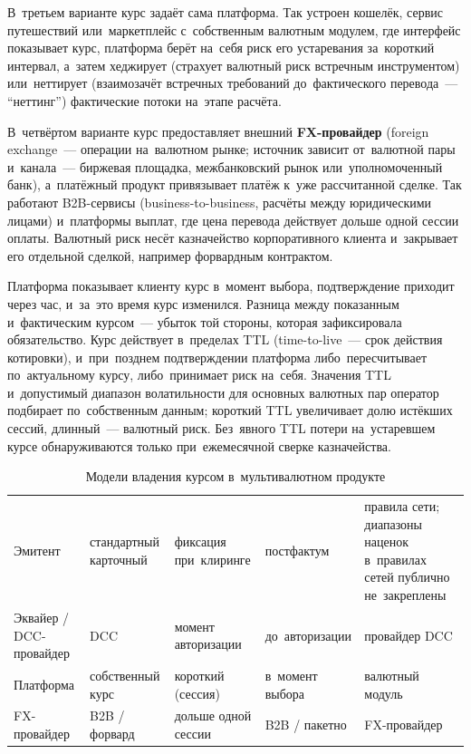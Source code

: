 В~третьем варианте курс задаёт сама платформа. Так устроен кошелёк, сервис
путешествий или~маркетплейс с~собственным валютным модулем, где интерфейс
показывает курс, платформа берёт на~себя риск его устаревания за~короткий
интервал, а~затем хеджирует (страхует валютный риск встречным инструментом)
или~неттирует (взаимозачёт встречных требований до~фактического перевода~---
\enquote{неттинг}) фактические потоки на~этапе расчёта.

В~четвёртом варианте курс предоставляет внешний \textbf{FX-провайдер} (foreign
  exchange~--- операции на~валютном рынке; источник зависит от~валютной пары
и~канала~--- биржевая площадка, межбанковский рынок или~уполномоченный банк),
а~платёжный продукт привязывает платёж к~уже рассчитанной сделке. Так работают
B2B-сервисы (business-to-business, расчёты между юридическими лицами) и~платформы выплат, где цена перевода действует дольше одной сессии
оплаты. Валютный риск несёт казначейство корпоративного клиента и~закрывает его
отдельной сделкой, например форвардным контрактом.

Платформа показывает клиенту курс в~момент выбора, подтверждение приходит через
час, и~за~это время курс изменился. Разница между показанным и~фактическим
курсом~--- убыток той стороны, которая зафиксировала обязательство. Курс
действует в~пределах TTL (time-to-live~--- срок действия котировки),
и~при~позднем подтверждении платформа либо~пересчитывает по~актуальному курсу,
либо~принимает риск на~себя. Значения TTL и~допустимый диапазон волатильности
для основных валютных пар оператор подбирает по~собственным данным; короткий
TTL увеличивает долю истёкших сессий, длинный~--- валютный риск. Без~явного TTL
потери на~устаревшем курсе обнаруживаются только при~ежемесячной сверке
казначейства.

\begin{table}[tbp]
  \caption{Модели владения курсом в~мультивалютном
  продукте}\label{tab:fx-ownership-models}
  \begingroup
  \tablesetup
  \begin{tabularx}{\textwidth}{@{}B{0.2\textwidth} P{0.16\textwidth} Y P{0.16\textwidth} Y@{}}
    \toprule
    \headrow
     &  &  &  &  \\
    \midrule
    Эмитент & стандартный карточный & фиксация при~клиринге & постфактум &
    правила сети; диапазоны наценок в~правилах сетей публично не~закреплены \\
    \rowsep
    Эквайер / DCC-провайдер & DCC & момент авторизации & до~авторизации & провайдер DCC \\
    \rowsep
    Платформа & собственный курс & короткий (сессия) & в~момент выбора & валютный модуль \\
    \rowsep
    FX-провайдер & B2B / форвард & дольше одной сессии & B2B / пакетно & FX-провайдер \\
    \bottomrule
  \end{tabularx}\par
  \endgroup
\end{table}

